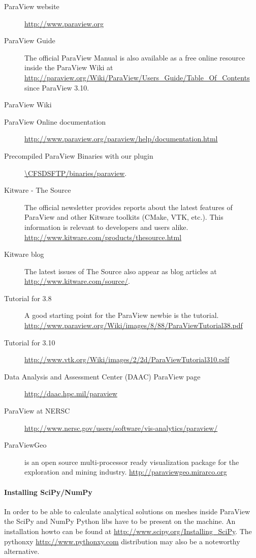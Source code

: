 \begin{description}
\item[ParaView website] \url{http://www.paraview.org} \cite{ParaViewWebSite}
\item[ParaView Guide] The official ParaView Manual \cite{PVGuide2007} is also available as a free online resource inside the ParaView Wiki at \url{http://paraview.org/Wiki/ParaView/Users_Guide/Table_Of_Contents} since ParaView 3.10.
\item[ParaView Wiki] \cite{PVWiki}
\item[ParaView Online documentation] \url{http://www.paraview.org/paraview/help/documentation.html}
\item[Precompiled ParaView Binaries with our plugin] \url{\CFSDSFTP/binaries/paraview}.
\item[Kitware - The Source] The official newsletter provides reports about the
latest  features   of  ParaView  and  other  Kitware   toolkits  (CMake,  VTK,
etc.).   This    information   is    relevant   to   developers    and   users
alike. \url{http://www.kitware.com/products/thesource.html}
\item[Kitware blog] The latest issues of The Source also appear as blog articles at \url{http://www.kitware.com/source/}.
\item[Tutorial for 3.8]  A good starting point for the  ParaView newbie is the tutorial. \url{http://www.paraview.org/Wiki/images/8/88/ParaViewTutorial38.pdf}
\item[Tutorial for 3.10] \url{http://www.vtk.org/Wiki/images/2/2d/ParaViewTutorial310.pdf}
\item[Data     Analysis    and     Assessment    Center     (DAAC)    ParaView
page] \url{http://daac.hpc.mil/paraview}
\item[ParaView at NERSC] \url{http://www.nersc.gov/users/software/vis-analytics/paraview/}
\item[ParaViewGeo] is an open source multi-processor ready visualization package for the exploration and mining industry. \url{http://paraviewgeo.mirarco.org}
\end{description}

\paragraph{Installing SciPy/NumPy}
In  order  to be  able  to calculate  analytical  solutions  on meshes  inside
ParaView the SciPy and NumPy Python libs have to be present on the machine. An
installation          howto          can          be         found          at
\url{http://www.scipy.org/Installing_SciPy}.            The           pythonxy
\url{http://www.pythonxy.com}   distribution   may   also  be   a   noteworthy
alternative.


